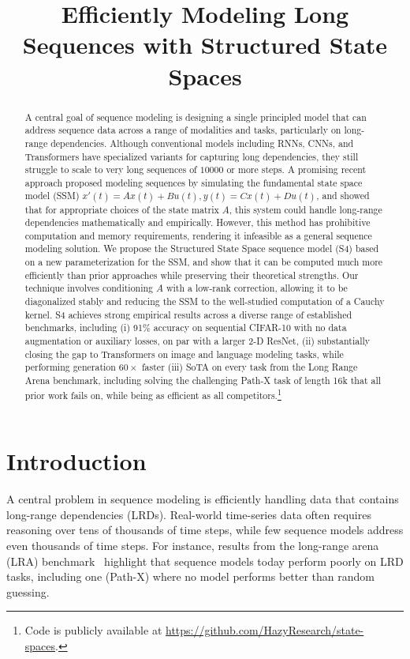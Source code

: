 \title{Efficiently Modeling Long Sequences with Structured State Spaces}

\begin{abstract}
A central goal of sequence modeling is designing a single principled model that can address sequence data across a range of modalities and tasks, particularly on long-range dependencies. Although conventional models including RNNs, CNNs, and Transformers have specialized variants for capturing long dependencies, they still struggle to scale to very long sequences of $10000$ or more steps. A promising recent approach proposed modeling sequences by simulating the fundamental state space model (SSM) \( x'(t) = Ax(t) + Bu(t), y(t) = Cx(t) + Du(t) \), and showed that for appropriate choices of the state matrix \( A \), this system could handle long-range dependencies mathematically and empirically. However, this method has prohibitive computation and memory requirements, rendering it infeasible as a general sequence modeling solution. We propose the Structured State Space sequence model (S4) based on a new parameterization for the SSM, and show that it can be computed much more efficiently than prior approaches while preserving their theoretical strengths. Our technique involves conditioning \( A \) with a low-rank correction, allowing it to be diagonalized stably and reducing the SSM to the well-studied computation of a Cauchy kernel. S4 achieves strong empirical results across a diverse range of established benchmarks, including (i) 91\% accuracy on sequential CIFAR-10 with no data augmentation or auxiliary losses, on par with a larger 2-D ResNet, (ii) substantially closing the gap to Transformers on image and language modeling tasks, while performing generation $60\times$ faster (iii) SoTA on every task from the Long Range Arena benchmark, including solving the challenging Path-X task of length 16k that all prior work fails on, while being as efficient as all competitors.\footnote{Code is publicly available at \url{https://github.com/HazyResearch/state-spaces}.}
\end{abstract}

\section{Introduction}
\label{sec:intro}

A central problem in sequence modeling is efficiently handling data that contains long-range dependencies (LRDs). Real-world time-series data often requires reasoning over tens of thousands of time steps, while few sequence models address even thousands of time steps. For instance, results from the long-range arena (LRA) benchmark~\citep{tay2021long} highlight that sequence models today perform poorly on LRD tasks, including one (Path-X) where no model performs better than random guessing.

